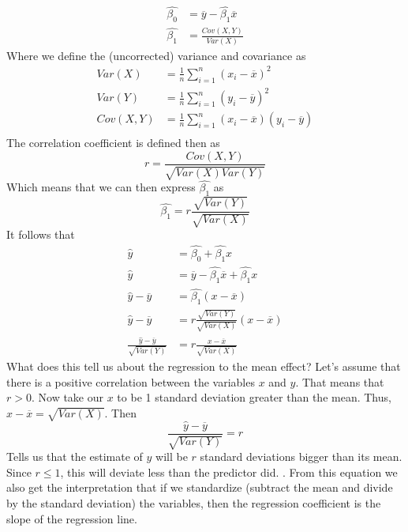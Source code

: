\documentclass{article}
\begin{document}
\begin{align*}
\hat{\beta_0} &= \overline{y} - \hat{\beta_1} \overline{x}\\
\hat{\beta_1} &= \frac{Cov(X,Y)}{Var(X)}
\end{align*}
Where we define the (uncorrected) variance and covariance as
\begin{align*}
Var(X) &= \frac{1}{n} \sum_{i = 1}^{n} (x_i - \overline{x})^2\\
Var(Y) &= \frac{1}{n} \sum_{i = 1}^{n} (y_i - \overline{y})^2\\
Cov(X,Y) &= \frac{1}{n} \sum_{i = 1}^{n} (x_i - \overline{x})(y_i - \overline{y})\\
\end{align*}
The correlation coefficient is defined then as
$$
r = \frac{Cov(X,Y)}{\sqrt{Var(X) Var(Y)}}
$$
Which means that we can then express $\hat{\beta_1}$ as 
$$
\hat{\beta_1} = r \frac{\sqrt{Var(Y)}}{\sqrt{Var(X)}} 
$$
It follows that
\begin{align*}
    \hat{y} &= \hat{\beta_0} + \hat{\beta_1} x\\
    \hat{y} &=  \overline{y} - \hat{\beta_1} \overline{x} +  \hat{\beta_1} x\\
    \hat{y} - \overline{y} &= \hat{\beta_1} (x - \overline{x})\\
    \hat{y} - \overline{y} &= r \frac{\sqrt{Var(Y)}}{\sqrt{Var(X)}} (x - \overline{x})\\
    \frac{
        \hat{y} - \overline{y}
    } {
    \sqrt{Var(Y)}
    } &=
    r \frac{
        x - \overline{x}
    } {
    \sqrt{Var(X)}
    } 
\end{align*}
What does this tell us about the regression to the mean effect?
Let's assume that there is a positive correlation between the variables $x$ and $y$.
That means that $r > 0$.
Now take our $x$ to be 1 standard deviation greater than the mean.
Thus, $x - \overline{x} = \sqrt{Var(X)}$.
Then
$$
\frac{
        \hat{y} - \overline{y}
    } {
    \sqrt{Var(Y)}
    }
    = r
$$
Tells us that the estimate of $y$ will be $r$ standard deviations bigger than its mean.
Since $r \leq 1$, this will deviate less than the predictor did.
\cite{rice_2007}.
From this equation we also get the interpretation that if we standardize (subtract the mean and divide by the standard deviation) the variables, then the regression coefficient is the slope of the regression line.
\end{document}
